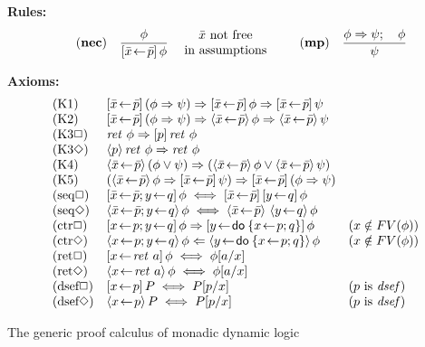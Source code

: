\begin{myfigure}
  \textbf{Rules:} 
  \begin{displaymath}\displaystyle
    \quad \NRule{nec}{\phi}{\PDLBox{\bar x\leteq\bar p}\phi}
    \mbox{~~\begin{tabular}{c}$\bar x$ not free\\ in assumptions\end{tabular}}
    \qquad
    \NRule{mp}{\phi\Rightarrow\psi;\quad\phi}{\psi}
  \end{displaymath}
  
  \textbf{Axioms:}
  \begin{displaymath}
    \begin{array}{lll}
      \textrm{(K1)} & \PDLBox{\bar x\leteq\bar p}(\phi\Rightarrow\psi)\Rightarrow
      \PDLBox{\bar x\leteq\bar p}\phi\Rightarrow\PDLBox{\bar x\leteq\bar p}\psi\\
      \textrm{(K2)} & \PDLBox{\bar x\leteq\bar p}(\phi\Rightarrow\psi)\Rightarrow
      \PDLDmd{\bar x\leteq\bar p}\phi\Rightarrow\PDLDmd{\bar x\leteq\bar p}\psi\\
      \textrm{(K3$\Box$)} & \ret~{\phi}\Rightarrow\PDLBox{p}\ret~{\phi}\\
      \textrm{(K3$\Diamond$)} & \PDLDmd{p}\ret~{\phi}\Rightarrow\ret~{\phi}\\
      \textrm{(K4)} & \PDLDmd{\bar x\leteq\bar p}(\phi\lor\psi)\Rightarrow
      (\PDLDmd{\bar x\leteq\bar p}\phi\lor\PDLDmd{\bar x\leteq\bar
        p}\psi)\\
      \textrm{(K5)} & (\PDLDmd{\bar x\leteq\bar p}\phi\Rightarrow\PDLBox{\bar x\leteq\bar
        p}\psi)
      \Rightarrow
      \PDLBox{\bar x\leteq\bar p}(\phi\Rightarrow\psi)\\
      \textrm{(seq$\Box$)} & \PDLBox{\bar x\leteq\bar p;y\leteq q}\phi \iff
      \PDLBox{\bar x\leteq\bar p}\PDLBox{y\leteq q}\phi\\
      \textrm{(seq$\Diamond$)} & \PDLDmd{\bar x\leteq\bar p; y\leteq q}\phi\iff
      \PDLDmd{\bar x\leteq\bar p}\,\PDLDmd{y\leteq q}\phi\\
      \textrm{(ctr$\Box$)} &
      \PDLBox{x\leteq p; y\leteq  q}\phi\Rightarrow
      \PDLBox{ y\leteq\DoStmt{ x\leteq p; q}}\phi
      & (x\notin FV(\phi))\\
      \textrm{(ctr$\Diamond$)} & \PDLDmd{ x\leteq p; y\leteq
        q}\phi \Leftarrow   \PDLDmd{ y\leteq\DoStmt{ x\leteq p; q}}\phi& (x\notin FV(\phi))\\
      \textrm{(ret$\Box$)} & \PDLBox{x\leteq \ret~{a}}\phi\iff\phi[a/x]\\
      \textrm{(ret$\Diamond$)} & 
      \PDLDmd{x\leteq \ret~{a}}\phi\iff\phi[a/x] \\
      \textrm{(dsef$\Box$)} & \PDLBox{x\leteq p}{P}\iff P[p/x]& (p \text{ is }
      \op{dsef}) \\
      \textrm{(dsef$\Diamond$)} & \PDLDmd{x\leteq p}{P} \iff  P[p/x] & (p \text{ is }
      \op{dsef})
    \end{array}
  \end{displaymath}
  \mylinesep
  \caption{The generic proof calculus of monadic dynamic logic}
  \label{fig:mon-dyn-logic}
\end{myfigure}

